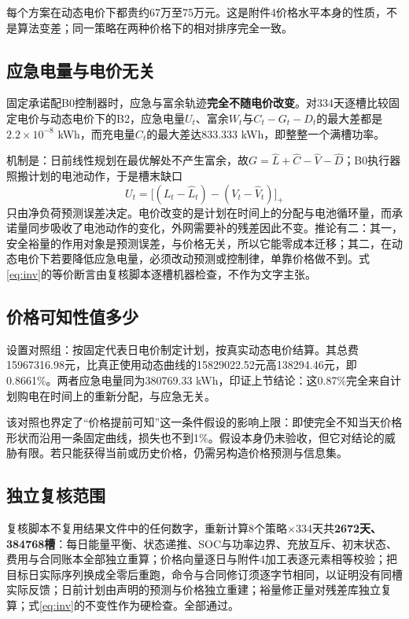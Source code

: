 \documentclass[UTF8,a4paper,zihao=-4,fontset=fandol]{ctexart}
\begin{document}
\begin{table}[H]\centering\caption{同一策略在两种电价下的总费对照}\label{tab:q4cmp}\small\end{table}
每个方案在动态电价下都贵约67万至75万元。这是附件4价格水平本身的性质，不是算法变差；同一策略在两种价格下的相对排序完全一致。

\subsection{应急电量与电价无关}
固定承诺配B0控制器时，应急与富余轨迹\textbf{完全不随电价改变}。对334天逐槽比较固定电价与动态电价下的B2，应急电量$U_t$、富余$W_t$与$C_t-G_t-D_t$的最大差都是$2.2\times10^{-8}$ kWh，而充电量$C_t$的最大差达833.333 kWh，即整整一个满槽功率。

机制是：日前线性规划在最优解处不产生富余，故$G=\widehat L+\widehat C-\widehat V-\widehat D$；B0执行器照搬计划的电池动作，于是槽末缺口
\begin{equation}\label{eq:inv}
U_t=\big[(L_t-\widehat L_t)-(V_t-\widehat V_t)\big]_+
\end{equation}
只由净负荷预测误差决定。电价改变的是计划在时间上的分配与电池循环量，而承诺量同步吸收了电池动作的变化，外网需要补的残差因此不变。推论有二：其一，安全裕量的作用对象是预测误差，与价格无关，所以它能零成本迁移；其二，在动态电价下若要降低应急电量，必须改动预测或控制律，单靠价格做不到。式\eqref{eq:inv}的等价断言由复核脚本逐槽机器检查，不作为文字主张。

\subsection{价格可知性值多少}\label{sec:price}
设置对照组：按固定代表日电价制定计划，按真实动态电价结算。其总费15967316.98元，比真正使用动态曲线的15829022.52元高138294.46元，即0.8661\%。两者应急电量同为380769.33 kWh，印证上节结论：这0.87\%完全来自计划购电在时间上的重新分配，与应急无关。

该对照也界定了“价格提前可知”这一条件假设的影响上限：即使完全不知当天价格形状而沿用一条固定曲线，损失也不到1\%。假设本身仍未验收，但它对结论的威胁有限。若只能获得当前或历史价格，仍需另构造价格预测与信息集。

\subsection{独立复核范围}
复核脚本不复用结果文件中的任何数字，重新计算8个策略$\times$334天共\textbf{2672天、384768槽}：每日能量平衡、状态递推、SOC与功率边界、充放互斥、初末状态、费用与合同账本全部独立重算；价格向量逐日与附件4加工表逐元素相等校验；把目标日实际序列换成全零后重跑，命令与合同修订须逐字节相同，以证明没有同槽实际反馈；日前计划由声明的预测与价格独立重建；裕量修正量对残差库独立复算；式\eqref{eq:inv}的不变性作为硬检查。全部通过。
\end{document}
